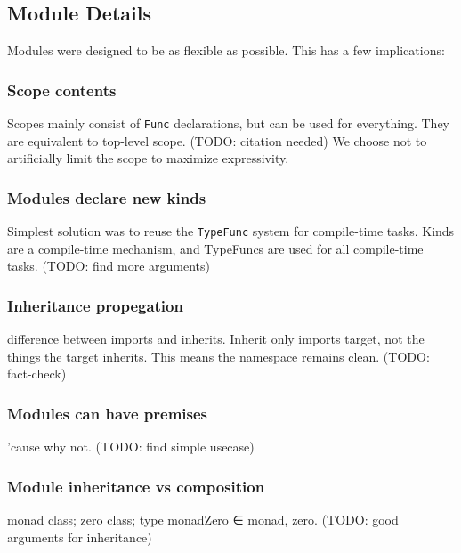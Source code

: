 \subsection{Module Details}
Modules were designed to be as flexible as possible.
This has a few implications:

\subsubsection*{Scope contents}
Scopes mainly consist of \texttt{Func} declarations, but can be used for everything.
They are equivalent to top-level scope. (TODO: citation needed) 
We choose not to artificially limit the scope to maximize expressivity.

\subsubsection*{Modules declare new kinds}
Simplest solution was to reuse the \texttt{TypeFunc} system for compile-time tasks.
Kinds are a compile-time mechanism, and TypeFuncs are used for all compile-time tasks.
(TODO: find more arguments)

\subsubsection*{Inheritance propegation}
difference between imports and inherits.
Inherit only imports target, not the things the target inherits.
This means the namespace remains clean. (TODO: fact-check)

\subsubsection*{Modules can have premises}
'cause why not. (TODO: find simple usecase)

\subsubsection*{Module inheritance vs composition}
monad class; zero class; type monadZero ∈ monad, zero.
(TODO: good arguments for inheritance)
